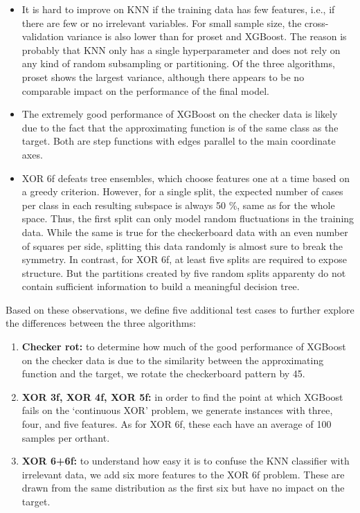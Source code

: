 \begin{itemize}
\item It is hard to improve on KNN if the training data has few features, i.e., if there are few or no irrelevant variables.
For small sample size, the cross-validation variance is also lower than for proset and XGBoost.
The reason is probably that KNN only has a single hyperparameter and does not rely on any kind of random subsampling or partitioning.
Of the three algorithms, proset shows the largest variance, although there appears to be no comparable impact on the performance of the final model.
%
\item The extremely good performance of XGBoost on the checker data is likely due to the fact that the approximating function is of the same class as the target.
Both are step functions with edges parallel to the main coordinate axes.
%
\item XOR 6f defeats tree ensembles, which choose features one at a time based on a greedy criterion.
However, for a single split, the expected number of cases per class in each resulting subspace is always 50 \%, same as for the whole space.
Thus, the first split can only model random fluctuations in the training data.
While the same is true for the checkerboard data with an even number of squares per side, splitting this data randomly is almost sure to break the symmetry.
In contrast, for XOR 6f, at least five splits are required to expose structure.
But the partitions created by five random splits apparenty do not contain sufficient information to build a meaningful decision tree.
\end{itemize}
%
Based on these observations, we define five additional test cases to further explore the differences between the three algorithms:
%
\begin{enumerate}
\item\textbf{Checker rot:} to determine how much of the good performance of XGBoost on the checker data is due to the similarity between the approximating function and the target, we rotate the checkerboard pattern by 45\textdegree.
%
\item\textbf{XOR 3f, XOR 4f, XOR 5f:} in order to find the point at which XGBoost fails on the `continuous XOR' problem, we generate instances with three, four, and five features.
As for XOR 6f, these each have an average of 100 samples per orthant.
%
\item\textbf{XOR 6+6f:} to understand how easy it is to confuse the KNN classifier with irrelevant data, we add six more features to the XOR 6f problem.
These are drawn from the same distribution as the first six but have no impact on the target.
\end{enumerate}
